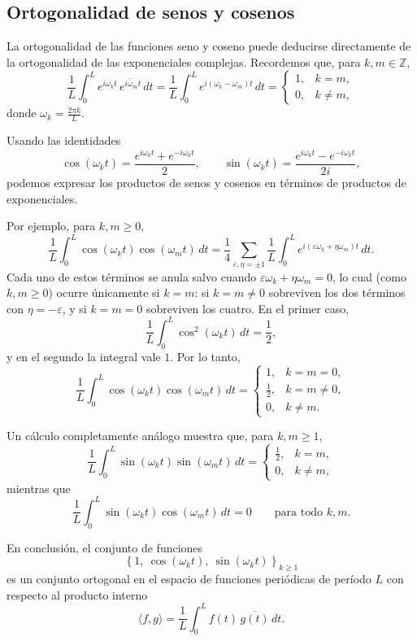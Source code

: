 \documentclass[12pt, a4paper]{amsbook}
\newcommand{\ve}{\varepsilon}
\newcommand{\Z}{{\mathbb Z}}
\theoremstyle{remark}
\theoremstyle{definition}
\numberwithin{section}{chapter}
\numberwithin{subsection}{section}
\numberwithin{equation}{section}
\numberwithin{figure}{chapter}
\begin{document}
\subsection{Ortogonalidad de senos y cosenos}

La ortogonalidad de las funciones seno y coseno puede deducirse directamente de la ortogonalidad de las exponenciales complejas. Recordemos que, para $k,m\in\Z$,
$$
\frac{1}{L}\int_0^L e^{i\omega_k t}\,\overline{e^{i\omega_m t}}\,dt = \frac{1}{L}\int_0^L e^{i(\omega_k-\omega_m)t}\,dt =
\begin{cases}
1, & k=m,\\
0, & k\neq m,
\end{cases}
$$
donde $\omega_k = \frac{2\pi k}{L}$.

Usando las identidades
$$
\cos(\omega_k t) = \frac{e^{i\omega_k t}+e^{-i\omega_k t}}{2}, \qquad \sin(\omega_k t) = \frac{e^{i\omega_k t}-e^{-i\omega_k t}}{2i},
$$
podemos expresar los productos de senos y cosenos en términos de productos de exponenciales.

Por ejemplo, para $k,m\ge 0$,
$$
\frac{1}{L}\int_0^L \cos(\omega_k t)\cos(\omega_m t)\,dt = \frac{1}{4}\sum_{\ve,\eta=\pm1} \frac{1}{L}\int_0^L e^{i(\ve\omega_k+\eta\omega_m)t}\,dt.
$$
Cada uno de estos términos se anula salvo cuando $\ve\omega_k+\eta\omega_m=0$, lo cual (como $k,m\ge0$) ocurre únicamente si $k=m$: si $k=m\neq0$ sobreviven los dos términos con $\eta=-\ve$, y si $k=m=0$ sobreviven los cuatro. En el primer caso,
$$
\frac{1}{L}\int_0^L \cos^2(\omega_k t)\,dt = \frac{1}{2},
$$
y en el segundo la integral vale $1$. Por lo tanto,
$$
\frac{1}{L}\int_0^L \cos(\omega_k t)\cos(\omega_m t)\,dt =
\begin{cases}
1, & k=m=0,\\
\frac{1}{2}, & k=m\neq 0,\\
0, & k\neq m.
\end{cases}
$$

Un cálculo completamente análogo muestra que, para $k,m\ge 1$,
$$
\frac{1}{L}\int_0^L \sin(\omega_k t)\sin(\omega_m t)\,dt =
\begin{cases}
\frac{1}{2}, & k=m,\\
0, & k\neq m,
\end{cases}
$$
mientras que
$$
\frac{1}{L}\int_0^L \sin(\omega_k t)\cos(\omega_m t)\,dt = 0 \qquad \text{para todo } k,m.
$$


En conclusión, el conjunto de funciones
$$
\left\{1,\ \cos(\omega_k t),\ \sin(\omega_k t)\right\}_{k\geq 1}
$$
es un conjunto ortogonal en el espacio de funciones periódicas de período $L$ con respecto al producto interno
$$
\langle f,g\rangle = \frac{1}{L}\int_0^L f(t)\,\overline{g(t)}\,dt.
$$
\end{document}
